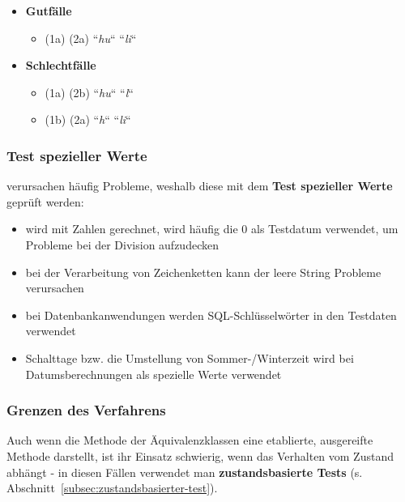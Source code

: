 \begin{itemize}
    \item \textbf{Gutfälle}
    \begin{itemize}
        \item[] (1a) (2a) ``\textit{hu}`` ``\textit{li}``
    \end{itemize}
    \item \textbf{Schlechtfälle}
    \begin{itemize}
        \item[] (1a) (2b) ``\textit{hu}`` ``\textit{l}``
        \item[] (1b) (2a) ``\textit{h}`` ``\textit{li}``
    \end{itemize}
\end{itemize}

\subsubsection*{Test spezieller Werte}
 verursachen häufig Probleme, weshalb diese mit dem \textbf{Test spezieller Werte} geprüft werden:

\begin{itemize}
    \item wird mit Zahlen gerechnet, wird häufig die $0$ als Testdatum verwendet, um Probleme bei der Division aufzudecken
    \item bei der Verarbeitung von Zeichenketten kann der leere String  Probleme verursachen
    \item bei Datenbankanwendungen werden SQL-Schlüsselwörter in den Testdaten verwendet
    \item Schalttage bzw. die Umstellung von Sommer-/Winterzeit wird bei Datumsberechnungen als spezielle Werte verwendet
\end{itemize}

\subsubsection*{Grenzen des Verfahrens}
Auch wenn die Methode der Äquivalenzklassen eine etablierte, ausgereifte Methode darstellt, ist ihr Einsatz schwierig, wenn das Verhalten vom Zustand abhängt - in diesen Fällen verwendet man \textbf{zustandsbasierte Tests} (s. Abschnitt~\ref{subsec:zustandsbasierter-test}).


